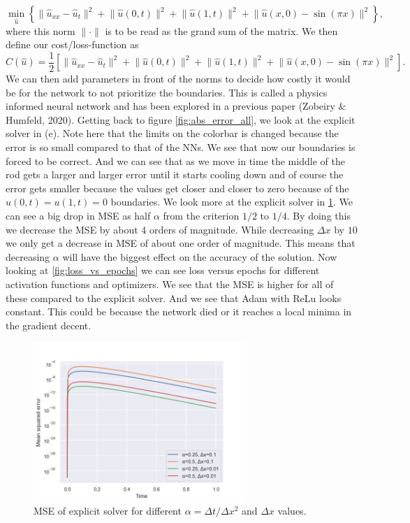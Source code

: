 \begin{equation*}
    \min_{\hat{u}} \left\{
    \lVert \hat u_{xx} - \hat u_t \rVert^2 
    + \lVert \hat u(0,t) \rVert^2 
    + \lVert \hat u(1,t) \rVert^2
    + \lVert \hat u(x,0)-\sin{(\pi x)}\rVert^2 \right\},
\end{equation*}
where this norm $\lVert \cdot \rVert$ is to be read as the grand sum of the
matrix. We then define our cost/loss-function as
\begin{equation*}
    C(\hat u) =\frac{1}{2} \left[ \lVert \hat u_{xx} - \hat u_t \rVert^2 
    + \lVert \hat u(0,t) \rVert^2 
    + \lVert \hat u(1,t) \rVert^2
    + \lVert \hat u(x,0)-\sin{(\pi x)}\rVert^2 \right].
\end{equation*}
We can then add parameters in front of the norms to decide how costly it would
be for the network to not prioritize the boundaries. This is called a physics
informed neural network and has been explored in a previous paper (Zobeiry \&
Humfeld, 2020)\cite{2}. Getting back to figure \ref{fig:abs_error_all}, we look
at the explicit solver in (e). Note here that the limits on the colorbar is
changed because the error is so small compared to that of the NNs. We see that
now our boundaries is forced to be correct. And we can see that as we move in
time the middle of the rod gets a larger and larger error until it starts
cooling down and of course the error gets smaller because the values get closer
and closer to zero because of the $u(0,t)=u(1,t)=0$ boundaries. We look more at
the explicit solver in \ref{fig:MSE_b}. We can see a big drop in MSE as half
$\alpha$ from the criterion $1/2$ to $1/4$. By doing this we decrease the MSE
by about 4 orders of magnitude. While decreasing $\Delta x$ by $10$ we only get
a decrease in MSE of about one order of magnitude. This means that decreasing
$\alpha$ will have the biggest effect on the accuracy of the solution. Now
looking at \ref{fig:loss_vs_epochs} we can see loss versus epochs for different
activation functions and optimizers. We see that the MSE is higher for all of
these compared to the explicit solver. And we see that Adam with ReLu looks
constant. This could be because the network died or it reaches a local minima
in the gradient decent.



\begin{figure}[h!]
    \centering
    \includegraphics[width=8cm]{../Figures/b_mse.png}
    \caption{MSE of explicit solver for different $\alpha=\Delta t/\Delta x^2$
    and $\Delta x$ values.}
    \label{fig:MSE_b}
\end{figure}

